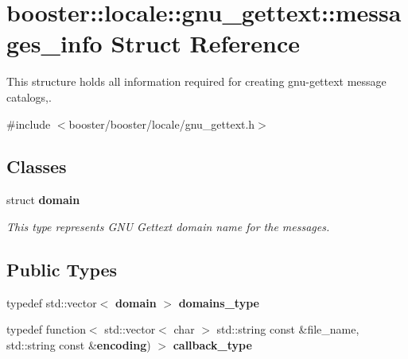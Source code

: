 \section{booster\+:\+:locale\+:\+:gnu\+\_\+gettext\+:\+:messages\+\_\+info Struct Reference}
\label{structbooster_1_1locale_1_1gnu__gettext_1_1messages__info}


This structure holds all information required for creating gnu-\/gettext message catalogs,.  




{\ttfamily \#include $<$booster/booster/locale/gnu\+\_\+gettext.\+h$>$}

\subsection*{Classes}
\begin{DoxyCompactItemize}
\item 
struct {\bf domain}
\begin{DoxyCompactList}\small\item\em This type represents G\+NU Gettext domain name for the messages. \end{DoxyCompactList}\end{DoxyCompactItemize}
\subsection*{Public Types}
\begin{DoxyCompactItemize}
\item 
typedef std\+::vector$<$ {\bf domain} $>$ {\bf domains\+\_\+type}
\item 
typedef function$<$ std\+::vector$<$ char $>$ std\+::string const \&file\+\_\+name, std\+::string const \&{\bf encoding}) $>$ {\bf callback\+\_\+type}
\end{DoxyCompactItemize}
